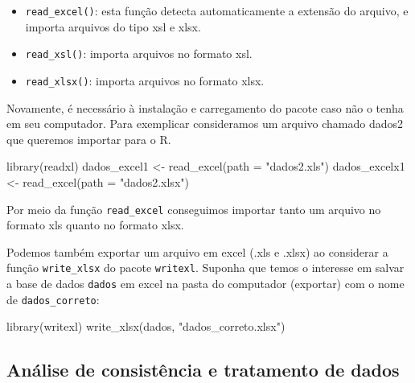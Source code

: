 \documentclass[
  letterpaper,
  DIV=11,
  numbers=noendperiod]{scrreprt}
\newenvironment{Shaded}{\begin{snugshade}}{\end{snugshade}}
\newcommand{\AttributeTok}[1]{\textcolor[rgb]{0.40,0.45,0.13}{#1}}
\newcommand{\FunctionTok}[1]{\textcolor[rgb]{0.28,0.35,0.67}{#1}}
\newcommand{\NormalTok}[1]{\textcolor[rgb]{0.00,0.23,0.31}{#1}}
\newcommand{\OtherTok}[1]{\textcolor[rgb]{0.00,0.23,0.31}{#1}}
\newcommand{\StringTok}[1]{\textcolor[rgb]{0.13,0.47,0.30}{#1}}
\begin{document}
\begin{itemize}
\item
  \texttt{read\_excel()}: esta função detecta automaticamente a extensão
  do arquivo, e importa arquivos do tipo xsl e xlsx.
\item
  \texttt{read\_xsl()}: importa arquivos no formato xsl.
\item
  \texttt{read\_xlsx()}: importa arquivos no formato xlsx.
\end{itemize}

Novamente, é necessário à instalação e carregamento do pacote caso não o
tenha em seu computador. Para exemplicar consideramos um arquivo chamado
dados2 que queremos importar para o R.

\begin{Shaded}
\begin{Highlighting}[]
\FunctionTok{library}\NormalTok{(readxl)}
\NormalTok{dados\_excel1 }\OtherTok{\textless{}{-}} \FunctionTok{read\_excel}\NormalTok{(}\AttributeTok{path =} \StringTok{"dados2.xls"}\NormalTok{)}
\NormalTok{dados\_excelx1 }\OtherTok{\textless{}{-}} \FunctionTok{read\_excel}\NormalTok{(}\AttributeTok{path =} \StringTok{"dados2.xlsx"}\NormalTok{)}
\end{Highlighting}
\end{Shaded}

Por meio da função \texttt{read\_excel} conseguimos importar tanto um
arquivo no formato xls quanto no formato xlsx.

Podemos também exportar um arquivo em excel (.xls e .xlsx) ao considerar
a função \texttt{write\_xlsx} do pacote \texttt{writexl}. Suponha que
temos o interesse em salvar a base de dados \texttt{dados} em excel na
pasta do computador (exportar) com o nome de \texttt{dados\_correto}:

\begin{Shaded}
\begin{Highlighting}[]
\FunctionTok{library}\NormalTok{(writexl)}
\FunctionTok{write\_xlsx}\NormalTok{(dados, }\StringTok{"dados\_correto.xlsx"}\NormalTok{)}
\end{Highlighting}
\end{Shaded}

\hypertarget{anuxe1lise-de-consistuxeancia-e-tratamento-de-dados}{%
\subsection{Análise de consistência e tratamento de
dados}\label{anuxe1lise-de-consistuxeancia-e-tratamento-de-dados}}
\end{document}
